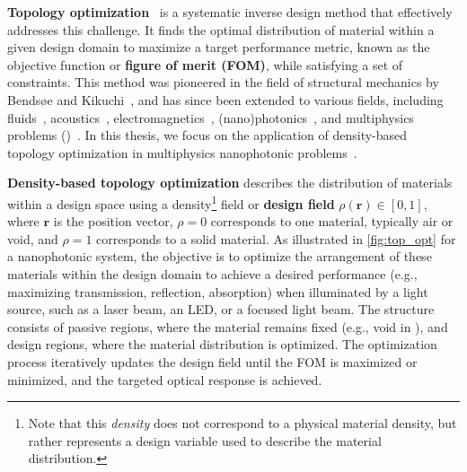 \textbf{Topology optimization}~\cite{topopt_book} is a systematic inverse design method that effectively addresses this challenge. It finds the optimal distribution of material within a given design domain to maximize a target performance metric,
 known as the objective function or \textbf{figure of merit (FOM)}, while satisfying a set of constraints. This method
was pioneered in the field of structural mechanics by Bendsøe and Kikuchi~\cite{bendsoe_kikukchi}, 
and has since been extended to various fields, including fluids~\cite{topopt_fluid}, acoustics~\cite{topopt_acoustic}, 
electromagnetics~\cite{topopt_EM}, (nano)photonics~\cite{topopt_phot}, and multiphysics problems ()~\cite{coupled_topopt}. In this thesis, we focus on the application of density-based~\cite{bendsoe_density, topopt_approaches} 
topology optimization in multiphysics nanophotonic problems~\cite{jensen_review}.

\textbf{Density-based topology optimization} describes the distribution of materials within a design space using a 
density\footnote{Note that this \emph{density} does not correspond to a physical material density, but rather represents a design variable used to describe the material distribution.} field or \textbf{design field} $\rho(\mathbf{r}) \in [0,1]$, where $\mathbf{r}$ is the position vector, $\rho = 0$ corresponds to one material, typically air or void, and $\rho = 1$ corresponds to a solid material.
 As illustrated 
in \autoref{fig:top_opt} for a nanophotonic system, the objective is to optimize the arrangement of these materials within 
the design domain to achieve a desired performance (e.g., maximizing transmission, reflection, absorption) when illuminated by a light source, such as a laser beam, an LED, or a focused light beam. 
The structure consists of passive regions, where the material remains fixed (e.g., void in ), and design regions, where the material distribution 
is optimized. The optimization process iteratively updates the design field until the FOM is maximized or minimized, and the targeted optical response is achieved.


